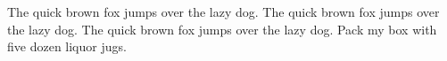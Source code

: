 \hsize=3in
\vsize=8.9in
\nopagenumbers
\noindent
The quick brown fox jumps over the lazy dog. The quick brown fox jumps
over the lazy dog. The quick brown fox jumps over the lazy dog. Pack my
box with five dozen liquor jugs.
\par
\bye
